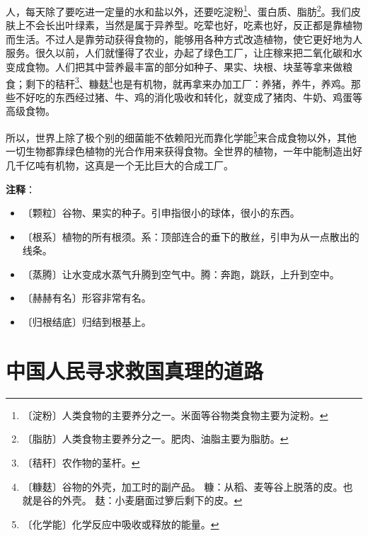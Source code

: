 \documentclass[12pt,UTF-8,openany]{ctexbook}
\begin{document}
\begin{normalsize}
    人，每天除了要吃进一定量的水和盐以外，还要吃淀粉\footnote{〔淀粉〕人类食物的主要养分之一。米面等谷物类食物主要为淀粉。}、蛋白质、脂肪\footnote{〔脂肪〕人类食物主要养分之一。肥肉、油脂主要为脂肪。}。我们皮肤上不会长出叶绿素，当然是属于异养型。吃荤也好，吃素也好，反正都是靠植物而生活。不过人是靠劳动获得食物的，能够用各种方式改造植物，使它更好地为人服务。很久以前，人们就懂得了农业，办起了绿色工厂，让庄稼来把二氧化碳和水变成食物。人们把其中营养最丰富的部分如种子、果实、块根、块茎等拿来做粮食；剩下的秸秆\footnote{〔秸秆〕农作物的茎杆。}、糠麸\footnote{〔糠麸〕谷物的外壳，加工时的副产品。 糠：从稻、麦等谷上脱落的皮。也就是谷的外壳。 麸：小麦磨面过箩后剩下的皮。}也是有机物，就再拿来办加工厂：养猪，养牛，养鸡。那些不好吃的东西经过猪、牛、鸡的消化吸收和转化，就变成了猪肉、牛奶、鸡蛋等高级食物。
    
    所以，世界上除了极个别的细菌能不依赖阳光而靠化学能\footnote{〔化学能〕化学反应中吸收或释放的能量。}来合成食物以外，其他一切生物都靠绿色植物的光合作用来获得食物。全世界的植物，一年中能制造出好几千亿吨有机物，这真是一个无比巨大的合成工厂。
    
\end{normalsize}


\newpage

\textbf{注释}：

\vspace{-1em}

\begin{itemize}
    \setlength\itemsep{-0.2em}
    \item 〔颗粒〕谷物、果实的种子。引申指很小的球体，很小的东西。
    \item 〔根系〕植物的所有根须。系：顶部连合的垂下的散丝，引申为从一点散出的线条。
    \item 〔蒸腾〕让水变成水蒸气升腾到空气中。腾：奔跑，跳跃，上升到空中。
    \item 〔赫赫有名〕形容非常有名。
    \item 〔归根结底〕归结到根基上。
\end{itemize}

\chapter{中国人民寻求救国真理的道路}
\end{document}

